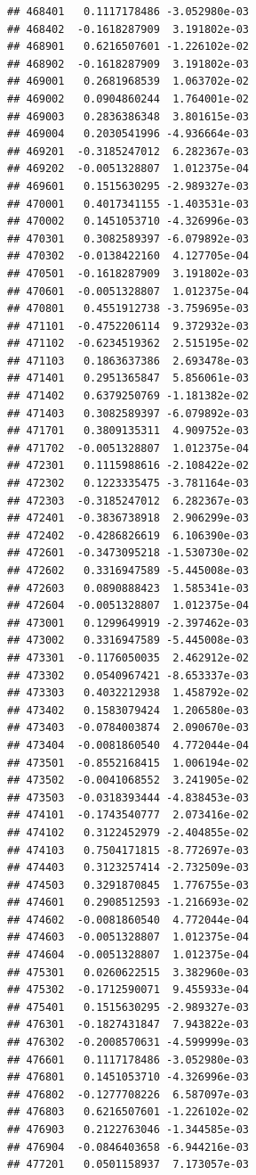 \documentclass[ignorenonframetext,]{beamer}
\begin{document}
\begin{frame}[fragile]
\begin{verbatim}
## 468401   0.1117178486 -3.052980e-03
## 468402  -0.1618287909  3.191802e-03
## 468901   0.6216507601 -1.226102e-02
## 468902  -0.1618287909  3.191802e-03
## 469001   0.2681968539  1.063702e-02
## 469002   0.0904860244  1.764001e-02
## 469003   0.2836386348  3.801615e-03
## 469004   0.2030541996 -4.936664e-03
## 469201  -0.3185247012  6.282367e-03
## 469202  -0.0051328807  1.012375e-04
## 469601   0.1515630295 -2.989327e-03
## 470001   0.4017341155 -1.403531e-03
## 470002   0.1451053710 -4.326996e-03
## 470301   0.3082589397 -6.079892e-03
## 470302  -0.0138422160  4.127705e-04
## 470501  -0.1618287909  3.191802e-03
## 470601  -0.0051328807  1.012375e-04
## 470801   0.4551912738 -3.759695e-03
## 471101  -0.4752206114  9.372932e-03
## 471102  -0.6234519362  2.515195e-02
## 471103   0.1863637386  2.693478e-03
## 471401   0.2951365847  5.856061e-03
## 471402   0.6379250769 -1.181382e-02
## 471403   0.3082589397 -6.079892e-03
## 471701   0.3809135311  4.909752e-03
## 471702  -0.0051328807  1.012375e-04
## 472301   0.1115988616 -2.108422e-02
## 472302   0.1223335475 -3.781164e-03
## 472303  -0.3185247012  6.282367e-03
## 472401  -0.3836738918  2.906299e-03
## 472402  -0.4286826619  6.106390e-03
## 472601  -0.3473095218 -1.530730e-02
## 472602   0.3316947589 -5.445008e-03
## 472603   0.0890888423  1.585341e-03
## 472604  -0.0051328807  1.012375e-04
## 473001   0.1299649919 -2.397462e-03
## 473002   0.3316947589 -5.445008e-03
## 473301  -0.1176050035  2.462912e-02
## 473302   0.0540967421 -8.653337e-03
## 473303   0.4032212938  1.458792e-02
## 473402   0.1583079424  1.206580e-03
## 473403  -0.0784003874  2.090670e-03
## 473404  -0.0081860540  4.772044e-04
## 473501  -0.8552168415  1.006194e-02
## 473502  -0.0041068552  3.241905e-02
## 473503  -0.0318393444 -4.838453e-03
## 474101  -0.1743540777  2.073416e-02
## 474102   0.3122452979 -2.404855e-02
## 474103   0.7504171815 -8.772697e-03
## 474403   0.3123257414 -2.732509e-03
## 474503   0.3291870845  1.776755e-03
## 474601   0.2908512593 -1.216693e-02
## 474602  -0.0081860540  4.772044e-04
## 474603  -0.0051328807  1.012375e-04
## 474604  -0.0051328807  1.012375e-04
## 475301   0.0260622515  3.382960e-03
## 475302  -0.1712590071  9.455933e-04
## 475401   0.1515630295 -2.989327e-03
## 476301  -0.1827431847  7.943822e-03
## 476302  -0.2008570631 -4.599999e-03
## 476601   0.1117178486 -3.052980e-03
## 476801   0.1451053710 -4.326996e-03
## 476802  -0.1277708226  6.587097e-03
## 476803   0.6216507601 -1.226102e-02
## 476903   0.2122763046 -1.344585e-03
## 476904  -0.0846403658 -6.944216e-03
## 477201   0.0501158937  7.173057e-03

\end{verbatim}
\end{frame}
\end{document}
